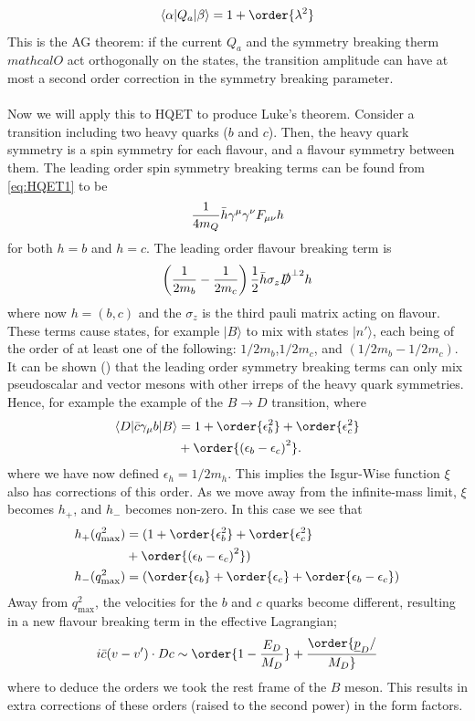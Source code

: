\begin{align}
	\langle \alpha | Q_a | \beta \rangle = 1 + \order{\lambda^2}
\end{align}
This is the AG theorem: if the current $Q_a$ and the symmetry breaking therm $mathcal{O}$ act orthogonally on the states, the transition amplitude can have at most a second order correction in the symmetry breaking parameter.
\\ \\
Now we will apply this to HQET to produce Luke's theorem. Consider a transition including two heavy quarks ($b$ and $c$). Then, the heavy quark symmetry is a spin symmetry for each flavour, and a flavour symmetry between them. The leading order spin symmetry breaking terms can be found from \eqref{eq:HQET1} to be
\begin{align}
	{1\over 4m_Q} \bar{h} \gamma^{\mu} \gamma^{\nu} F_{\mu\nu} h 
\end{align}
for both $h=b$ and $h=c$. The leading order flavour breaking term is
\begin{align}
	\left({1\over 2m_b} - {1\over 2m_c} \right) {1\over 2} \bar{h} \sigma_z \slashed{D}^{\perp 2} h
\end{align}
where now $h = (b,c)$ and the $\sigma_z$ is the third pauli matrix acting on flavour. These terms cause states, for example $| B \rangle$ to mix with states $|n'\rangle$, each being of the order of at least one of the following: $1/2m_b$,$1/2m_c$, and $(1/2m_b - 1/2m_c)$. It can be shown (\cite{Lebed:1991sq}) that the leading order symmetry breaking terms can only mix pseudoscalar and vector mesons with other irreps of the heavy quark symmetries. Hence, for example the example of the $B \to D$ transition, where
\begin{align}
	\langle D | \bar{c}\gamma_{\mu} b | B \rangle &= 1 + \order{\epsilon_b^2} 
	+ \order{\epsilon_c^2} \\ &+ \order{\left( \epsilon_b - \epsilon_c \right)^2}.
\end{align}
where we have now defined $\epsilon_h = 1/2m_h$. This implies the Isgur-Wise function $\xi$ also has corrections of this order. As we move away from the infinite-mass limit, $\xi$ becomes $h_+$, and $h_-$ becomes non-zero. In this case we see that
\begin{align}
	h_+(q^2_{\text{max}}) &= ( 1 + \order{ \epsilon_b^2}
	+ \order{\epsilon_c^2} \\ &+ \order{\left( \epsilon_b - \epsilon_c \right)^2} ) \\
	h_-(q^2_{\text{max}}) &= ( \order{ \epsilon_b }
	+ \order{ \epsilon_c } + \order{ \epsilon_b - \epsilon_c } )
\end{align}
Away from $q^2_{\text{max}}$, the velocities for the $b$ and $c$ quarks become different, resulting in a new flavour breaking term in the effective Lagrangian;
\begin{align}
	i \bar{c} (v - v')\cdot D c \sim \order{1-{E_D\over M_D}} + \order{ \underline{p}_D/\over M_D }
\end{align}
where to deduce the orders we took the rest frame of the $B$ meson. This results in extra corrections of these orders (raised to the second power) in the form factors. 

